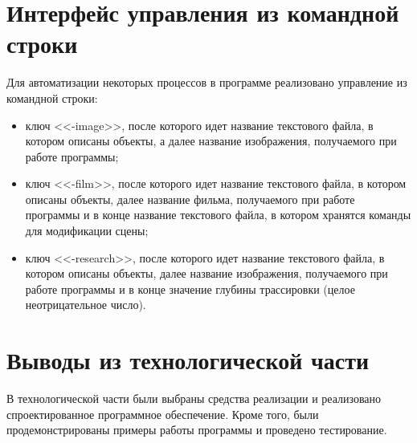 \clearpage


\section{Интерфейс управления из командной строки}

Для автоматизации некоторых процессов в программе реализовано управление из командной строки:

\begin{itemize}
	\item ключ <<-image>>, после которого идет название текстового файла, в котором описаны объекты, а далее название изображения, получаемого при работе программы;
	\item ключ <<-film>>, после которого идет название текстового файла, в котором описаны объекты, далее название фильма, получаемого при работе программы и в конце название текстового файла, в котором хранятся команды для модификации сцены;
	\item ключ <<-research>>, после которого идет название текстового файла, в котором описаны объекты, далее название изображения, получаемого при работе программы и в конце значение глубины трассировки (целое неотрицательное число).
\end{itemize}

\section{Выводы из технологической части}

В технологической части были выбраны средства реализации и реализовано спроектированное программное обеспечение. Кроме того, были продемонстрированы примеры работы программы и проведено тестирование.
